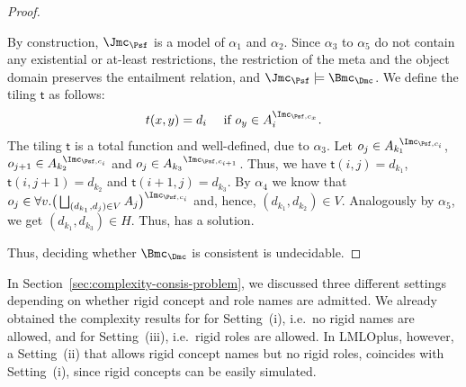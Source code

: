 \begin{proof}
\begin{claimproof}
    By construction, $\J_{\Psf}$ is a model of $\alpha_{1}$ and $\alpha_{2}$. Since $\alpha_{3}$ to
    $\alpha_{5}$ do not contain any existential or at-least restrictions, the restriction of the
    meta and the object domain preserves the entailment relation, and
    $\J_{\Psf}\models\Bmc_{\Dmc}$. We define the tiling $\mathsf{t}$ as follows:
    \begin{align*}
      t(x,y) = d_{i} \quad\text{ if $o_{y} \in A_{i}^{\I_{\Psf,c_{x}}}$}.
    \end{align*}
    The tiling $\mathsf{t}$ is a total function and well-defined, due to $\alpha_{3}$. Let
    $o_{j} \in {A_{k_{1}}}^{\!\!\!\I_{\Psf,c_{i}}}$,
    $o_{j+1} \in {A_{k_{2}}}^{\!\!\!\I_{\Psf,c_{i}}}$ and
    $o_{j} \in {A_{k_{3}}}^{\I_{\Psf,c_{i+1}}}$. Thus, we have $\mathsf{t}(i,j) = d_{k_{1}}$,
    $\mathsf{t}(i,j+1) = d_{k_{2}}$ and $\mathsf{t}(i+1,j) = d_{k_{3}}$. By $\alpha_{4}$ we know
    that
    $o_{j} \in \smash{\forall v.\big(\bigsqcup_{(d_{k_{1}},d_{j})\in V}
      A_{j}\big)^{\I_{\Psf,c_{i}}}}$ and, hence, $(d_{k_{1}}, d_{k_{2}})\in V$. Analogously by
    $\alpha_{5}$, we get $(d_{k_{1}}, d_{k_{3}})\in H$. Thus, \Dmc has a solution.
  \end{claimproof}

  Thus, deciding whether $\Bmc_{\Dmc}$ is consistent is undecidable.
\end{proof}

In Section~\ref{sec:complexity-consis-problem}, we discussed three different settings depending on
whether rigid concept and role names are admitted. We already obtained the complexity results for
\LMLOplus for Setting~(i), i.e.~no rigid names are allowed, and for Setting~(iii), i.e.~rigid roles
are allowed.  In LMLOplus, however, a Setting~(ii) that allows rigid concept names but no rigid
roles, coincides with Setting~(i), since rigid concepts can be easily simulated.

